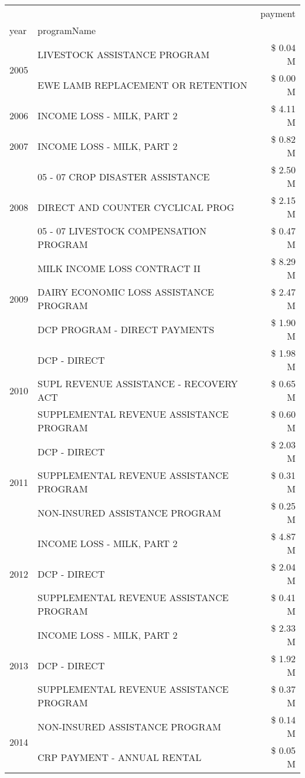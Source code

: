 \begin{tabular}{llr}
\toprule
 &  & payment \\
year & programName &  \\
\midrule
\multirow[t]{2}{*}{2005} & LIVESTOCK ASSISTANCE PROGRAM & \$ 0.04 M \\
 & EWE LAMB REPLACEMENT OR RETENTION & \$ 0.00 M \\
\cline{1-3}
2006 & INCOME LOSS - MILK, PART 2 & \$ 4.11 M \\
\cline{1-3}
2007 & INCOME LOSS - MILK, PART 2 & \$ 0.82 M \\
\cline{1-3}
\multirow[t]{3}{*}{2008} & 05 - 07 CROP DISASTER ASSISTANCE & \$ 2.50 M \\
 & DIRECT AND COUNTER CYCLICAL PROG & \$ 2.15 M \\
 & 05 - 07 LIVESTOCK COMPENSATION PROGRAM & \$ 0.47 M \\
\cline{1-3}
\multirow[t]{3}{*}{2009} & MILK INCOME LOSS CONTRACT II & \$ 8.29 M \\
 & DAIRY ECONOMIC LOSS ASSISTANCE PROGRAM & \$ 2.47 M \\
 & DCP PROGRAM - DIRECT PAYMENTS & \$ 1.90 M \\
\cline{1-3}
\multirow[t]{3}{*}{2010} & DCP - DIRECT & \$ 1.98 M \\
 & SUPL REVENUE ASSISTANCE - RECOVERY ACT & \$ 0.65 M \\
 & SUPPLEMENTAL REVENUE ASSISTANCE PROGRAM & \$ 0.60 M \\
\cline{1-3}
\multirow[t]{3}{*}{2011} & DCP - DIRECT & \$ 2.03 M \\
 & SUPPLEMENTAL REVENUE ASSISTANCE PROGRAM & \$ 0.31 M \\
 & NON-INSURED ASSISTANCE PROGRAM & \$ 0.25 M \\
\cline{1-3}
\multirow[t]{3}{*}{2012} & INCOME LOSS - MILK, PART 2 & \$ 4.87 M \\
 & DCP - DIRECT & \$ 2.04 M \\
 & SUPPLEMENTAL REVENUE ASSISTANCE PROGRAM & \$ 0.41 M \\
\cline{1-3}
\multirow[t]{3}{*}{2013} & INCOME LOSS - MILK, PART 2 & \$ 2.33 M \\
 & DCP - DIRECT & \$ 1.92 M \\
 & SUPPLEMENTAL REVENUE ASSISTANCE PROGRAM & \$ 0.37 M \\
\cline{1-3}
\multirow[t]{3}{*}{2014} & NON-INSURED ASSISTANCE PROGRAM & \$ 0.14 M \\
 & CRP PAYMENT - ANNUAL RENTAL & \$ 0.05 M \\

\end{tabular}
